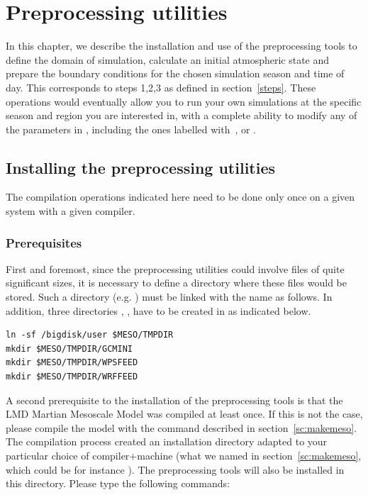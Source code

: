 \chapter{Preprocessing utilities}\label{zepreproc}

\vk
In this chapter, we describe the installation and use of the preprocessing tools to define the domain of simulation, calculate an initial atmospheric state and prepare the boundary conditions for the chosen simulation season and time of day. This corresponds to steps 1,2,3 as defined in section~\ref{steps}. These operations would eventually allow you to run your own simulations at the specific season and region you are interested in, with a complete ability to modify any of the parameters in , including the ones labelled with~,  or .

\mk
\section{Installing the preprocessing utilities}

\sk
The compilation operations indicated here need to be done only once on a given system with a given compiler. 

\sk
\subsection{Prerequisites}

\sk
First and foremost, since the preprocessing utilities could involve files of quite significant sizes, it is necessary to define a directory where these files would be stored. Such a directory (e.g. ) must be linked with the name  as follows. In addition, three directories , ,  have to be created in  as indicated below.

\begin{verbatim}
ln -sf /bigdisk/user $MESO/TMPDIR
mkdir $MESO/TMPDIR/GCMINI
mkdir $MESO/TMPDIR/WPSFEED
mkdir $MESO/TMPDIR/WRFFEED
\end{verbatim}

\sk
A second prerequisite to the installation of the preprocessing tools is that the LMD Martian Mesoscale Model was compiled at least once. If this is not the case, please compile the model with the  command described in section~\ref{sc:makemeso}. The compilation process created an installation directory adapted to your particular choice of compiler$+$machine (what we named  in section~\ref{sc:makemeso}, which could be for instance ). The preprocessing tools will also be installed in this directory. Please type the following commands:

